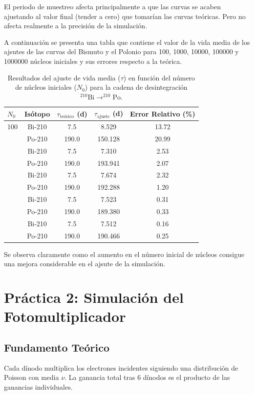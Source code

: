 \documentclass[11pt,a4paper]{article}
\begin{document}
El periodo de muestreo afecta principalmente a que las curvas se acaben ajustando al valor final (tender a cero) que tomarían las curvas teóricas. Pero no afecta realmente a la precisión de la simulación.

A continuación se presenta una tabla que contiene el valor de la vida media de los ajsutes de las curvas del Bismuto y el Polonio para 100, 1000, 10000, 100000 y 1000000 núcleos iniciales y sus errores respecto a la teórica.

\begin{table}[H]
    \centering
    \caption{Resultados del ajuste de vida media ($\tau$) en función del número de núcleos iniciales ($N_0$) para la cadena de desintegración $^{210}\text{Bi} \to ^{210}\text{Po}$.}
    \begin{tabular}{lcccc}
        \toprule
        $N_0$ & Isótopo & $\tau_{\text{teórico}}$ (d) & $\tau_{\text{ajuste}}$ (d) & Error Relativo (\%) \\
        \midrule
        100 & Bi-210 & 7.5 & 8.529 & 13.72 \\
        & Po-210 & 190.0 & 150.128 & 20.99 \\
        \addlinespace
        1000 & Bi-210 & 7.5 & 7.310 & 2.53 \\
        & Po-210 & 190.0 & 193.941 & 2.07 \\
        \addlinespace
        10000 & Bi-210 & 7.5 & 7.674 & 2.32 \\
        & Po-210 & 190.0 & 192.288 & 1.20 \\
        \addlinespace
        100000 & Bi-210 & 7.5 & 7.523 & 0.31 \\
        & Po-210 & 190.0 & 189.380 & 0.33 \\
        \addlinespace
        1000000 & Bi-210 & 7.5 & 7.512 & 0.16 \\
        & Po-210 & 190.0 & 190.466 & 0.25 \\
        \bottomrule
    \end{tabular}
    \label{tab:convergencia_final_completa}
\end{table}

Se observa claramente como el aumento en el número inicial de núcleos consigue una mejora considerable en el ajsute de la simulación.

\section{Práctica 2: Simulación del Fotomultiplicador}
\subsection{Fundamento Teórico}
Cada dínodo multiplica los electrones incidentes siguiendo una distribución de Poisson con media $\nu$. La ganancia total tras 6 dínodos es el producto de las ganancias individuales.
\end{document}
